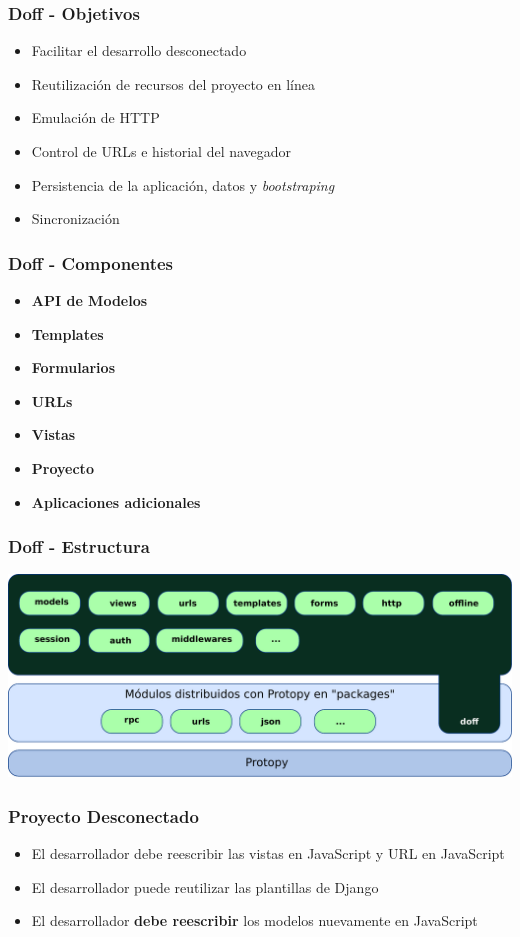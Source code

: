\documentclass{beamer}
\begin{document}
\begin{frame}
    \frametitle{Doff - Objetivos}
    \begin{itemize}
        \item{Facilitar el desarrollo desconectado}
        \item{Reutilización de recursos del proyecto en línea}
        \item{Emulación de HTTP}
        \item{Control de URLs e historial del navegador}
        \item{Persistencia de la aplicación, datos y {\it bootstraping}}
        \item{Sincronización}
        \end{itemize}
\end{frame}
    

\begin{frame}
    \frametitle{Doff - Componentes}
    \begin{itemize}
        \item {\bf API de Modelos }
        \item {\bf Templates }
        \item {\bf Formularios }
        \item {\bf URLs }
        \item {\bf Vistas }
        \item {\bf Proyecto }
        \item {\bf Aplicaciones adicionales }
    \end{itemize}
\end{frame}

\begin{frame}
    \frametitle{Doff - Estructura}
    \includegraphics[scale=0.5]{esquema_doff.pdf}
\end{frame}

\begin{frame}
    \frametitle{Proyecto Desconectado}
    \begin{itemize}
        \item{El desarrollador debe reescribir las vistas en JavaScript y URL
        en JavaScript}
        \item{El desarrollador puede reutilizar las plantillas de Django}
        \item{El desarrollador \textbf{debe reescribir} los modelos
            nuevamente en JavaScript}   
    \end{itemize}
\end{frame}
\end{document}

